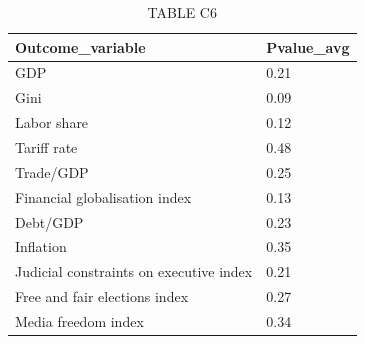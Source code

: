\documentclass{article}
\begin{document}
\begin{table}[tbp] \centering
{}

\caption{TABLE C6}
\begin{tabularx}{\linewidth}{lC}

\toprule
{Outcome\_variable}&{Pvalue\_avg} \tabularnewline
\midrule \addlinespace[\belowrulesep]
GDP&0.21 \tabularnewline
Gini&0.09 \tabularnewline
Labor share&0.12 \tabularnewline
Tariff rate&0.48 \tabularnewline
Trade/GDP&0.25 \tabularnewline
Financial globalisation index&0.13 \tabularnewline
Debt/GDP&0.23 \tabularnewline
Inflation&0.35 \tabularnewline
Judicial constraints on executive index&0.21 \tabularnewline
Free and fair elections index&0.27 \tabularnewline
Media freedom index&0.34 \tabularnewline
\bottomrule 

\end{tabularx}
\end{table}
\end{document}

